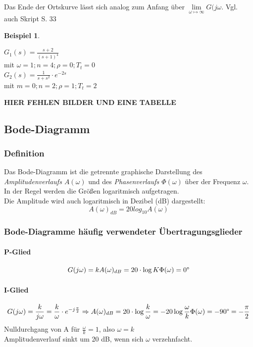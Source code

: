 \documentclass[12pt,a4paper,ngerman]{scrartcl}
\newtheorem{bsp}{Beispiel}[section] %
\begin{document}
Das Ende der Ortskurve lässt sich analog zum Anfang über $\lim\limits_{\omega \mapsto \infty}{G(j\omega}$. Vgl. auch Skript S. 33
\begin{bsp}
\end{bsp}
$G_1(s)=\frac{s+2}{(s+1)^4}$ \\
mit $\omega =1;n=4;\rho=0;T_t=0$\\
$G_2(s)=\frac{1}{s+s^2}\cdot e^{-2s}$\\
mit $m=0;n=2;\rho=1;T_t=2$

\textbf{HIER FEHLEN BILDER UND EINE TABELLE}
\subsection{Bode-Diagramm}

\subsubsection{Definition}

Das Bode-Diagramm ist die getrennte graphische Darstellung des \emph{Amplitudenverlaufs $A(\omega)$} und des \emph{Phasenverlaufs $\Phi(\omega)$} über der Frequenz $\omega$. In der Regel werden die Größen logaritmisch aufgetragen.\\
Die Amplitude wird auch logaritmisch in Dezibel (dB) dargestellt:
\[
A(\omega)_{dB}=20 log_{10}A(\omega)
\]

\subsubsection{Bode-Diagramme häufig verwendeter Übertragungsglieder}

\paragraph{P-Glied}

\[
G(j\omega)=k\\
A(\omega)_{dB}=20\cdot \log{K}\\
\Phi(\omega)=0\degree
\]

\paragraph{I-Glied}

\[
G(j\omega)=\frac{k}{j\omega}=\frac{k}{\omega}\cdot e^{-j\frac{\pi}{2}}\\
\Rightarrow A(\omega)_{dB}=20\cdot \log{\frac{k}{\omega}}=-20 \log{\frac{\omega}{k}}\\
\Phi(\omega)=-90\degree=-\frac{\pi}{2}
\]
Nulldurchgang von A für $\frac{\omega}{k}=1$, also $\omega =k$\\
Amplitudenverlauf sinkt um 20 dB, wenn sich $\omega$  verzehnfacht.
\end{document}
